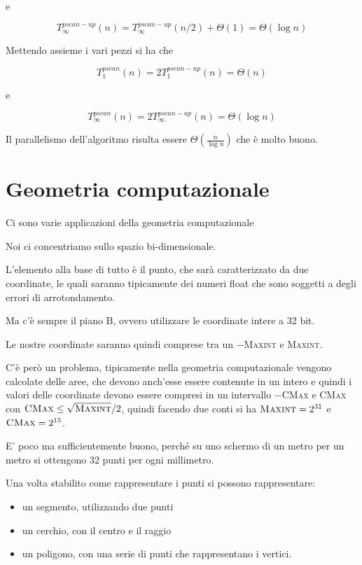e

$$
T_{\infty}^{pscan-up}(n) = T_{\infty}^{pscan-up}(n/2) + \Theta(1) = \Theta(\log n)
$$

Mettendo assieme i vari pezzi si ha che

$$
T_{1}^{pscan}(n) = 2 T_{1}^{pscan-up}(n) = \Theta(n)
$$

e

$$
T_{\infty}^{pscan}(n) = 2T_{\infty}^{pscan-up}(n) = \Theta(\log n)
$$

Il parallelismo dell'algoritmo risulta essere $\Theta(\frac{n}{\log n})$ che è molto buono.


\chapter{Geometria computazionale}

Ci sono varie applicazioni della geometria computazionale

Noi ci concentriamo sullo spazio bi-dimensionale.

L'elemento alla base di tutto è il punto, che sarà caratterizzato da due coordinate, le quali saranno tipicamente dei numeri float che sono soggetti a degli errori di arrotondamento.

Ma c'è sempre il piano B, ovvero utilizzare le coordinate intere a 32 bit.

Le nostre coordinate saranno quindi comprese tra un $-$\textsc{Maxint} e \textsc{Maxint}.

C'è però un problema, tipicamente nella geometria computazionale vengono calcolate delle aree, che devono anch'esse essere contenute in un intero e quindi i valori delle coordinate devono essere compresi in un intervallo $-$\textsc{CMax} e \textsc{CMax} con $\textsc{CMax} \leq \sqrt{\textsc{Maxint}} /2$, quindi facendo due conti si ha $\textsc{Maxint} = 2^{31} $ e $\textsc{CMax} = 2^{15}$.

E' poco ma sufficientemente buono, perché su uno schermo di un metro per un metro si ottengono 32 punti per ogni millimetro.

Una volta stabilito come rappresentare i punti si possono rappresentare:

\begin{itemize}
\item   un segmento, utilizzando due punti
\item   un cerchio, con il centro e il raggio
\item   un poligono, con una serie di punti che rappresentano i vertici.
\end{itemize}

